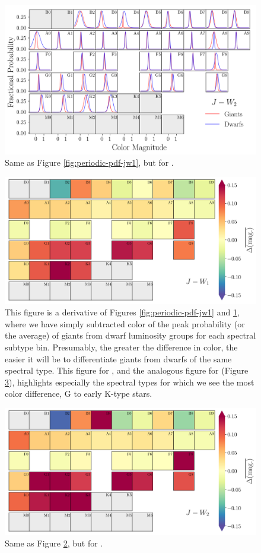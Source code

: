 \begin{figure}
    \centering
    \includegraphics[width=1.0\textwidth,clip=true]{Figures/periodic/periodic-t-pdf_J_W2.png}
    \caption{Same as Figure \ref{fig:periodic-pdf-jw1}, but for \jwtwo.}
    \label{fig:periodic-pdf-jw2}
\end{figure}
\clearpage
\begin{figure}
    \centering
    \includegraphics[width=1.0\textwidth,clip=true]{Figures/periodic/periodic-delta_J_W1.png}
    \caption{This figure is a derivative of Figures \ref{fig:periodic-pdf-jw1} and \ref{fig:periodic-pdf-jw2}, where we have simply subtracted color of the peak probability (or the average) of giants from dwarf luminosity groups for each spectral subtype bin. Presumably, the greater the difference in color, the easier it will be to differentiate giants from dwarfs of the same spectral type. This figure for \jwtwo, and the analogous figure for \jwtwo (Figure \ref{fig:periodic-delta-jw2}), highlights especially the spectral types for which we see the most color difference, G to early K-type stars.}
    \label{fig:periodic-delta-jw1}
\end{figure}

\begin{figure}
    \centering
    \includegraphics[width=1.0\textwidth,clip=true]{Figures/periodic/periodic-delta_J_W2.png}
    \caption{Same as Figure \ref{fig:periodic-delta-jw1}, but for \jwtwo.}
    \label{fig:periodic-delta-jw2}
\end{figure}
